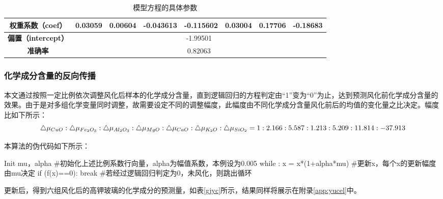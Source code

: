 \documentclass[withoutpreface,bwprint]{cumcmthesis} %
\begin{document}
\begin{itemize}
	\begin{table}[!h]
		\centering
		\small
		\caption{模型方程的具体参数}
		\label{canshu}
		\begin{tabular}{|c|ccccccc|}
			\hline
			\textbf{权重系数（coef）}    & \multicolumn{1}{c|}{0.03059} & \multicolumn{1}{c|}{0.00604} & \multicolumn{1}{c|}{-0.043613} & \multicolumn{1}{c|}{-0.115602} & \multicolumn{1}{c|}{0.03004} & \multicolumn{1}{c|}{0.17706} & -0.18683 \\ \hline
			\textbf{偏置（intercept）} & \multicolumn{7}{c|}{-1.99501}                                                                                                                                                                          \\ \hline
			\textbf{准确率}           & \multicolumn{7}{c|}{0.82063}                                                                                                                                                                           \\ \hline
		\end{tabular}
	\end{table}
	
\end{itemize}

\subsubsection{化学成分含量的反向传播}

本文通过按照一定比例依次调整风化后样本的化学成分含量，直到逻辑回归的方程判定由“1”变为“0”为止，达到预测风化前化学成分含量的效果。由于是对多组化学变量同时调整，故需要设定不同的调整幅度，此幅度由不同化学成分含量风化前后的均值的变化量之比决定。幅度比如下所示： $$\bigtriangleup \mu_{CuO}:\bigtriangleup \mu_{Fe_{2}O_{3}}:\bigtriangleup \mu_{Al_{2}O_{3}}:\bigtriangleup \mu_{MgO}:\bigtriangleup \mu_{CaO}:\bigtriangleup \mu_{K_{2}O}:\bigtriangleup \mu_{SiO_{2}} \\
=1:2.166:5.587:1.213:5.209:11.814:-37.913$$ 


本算法的伪代码如下所示：

\begin{python}
	Init mu，alpha       #初始化上述比例系数行向量，alpha为幅值系数，本例设为0.005
	while :
	x = x*(1+alpha*mu) #更新x，每个x的更新幅度由mu决定
	if (f(x)==0):
	break            #若经过逻辑回归判定为0，未风化，则跳出循环
\end{python}

更新后，得到六组风化后的高钾玻璃的化学成分的预测量，如表\ref{gjyc}所示，结果同样将展示在附录\ref{app:yucel}中。
\end{document}
